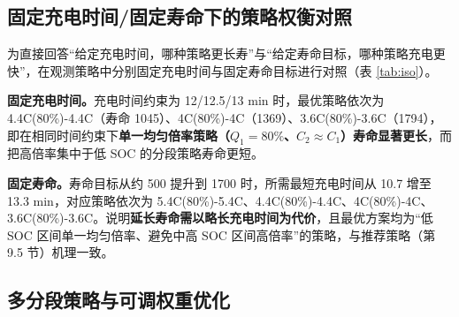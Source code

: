 \documentclass[withoutpreface]{cumcmthesis}
\begin{document}
\subsection{固定充电时间/固定寿命下的策略权衡对照}\label{sec:iso}

为直接回答“给定充电时间，哪种策略更长寿”与“给定寿命目标，哪种策略充电更快”，在观测策略中分别固定充电时间与固定寿命目标进行对照（表 \ref{tab:iso}）。

\textbf{固定充电时间。}充电时间约束为 12/12.5/13 min 时，最优策略依次为 4.4C(80\%)-4.4C（寿命 1045）、4C(80\%)-4C（1369）、3.6C(80\%)-3.6C（1794），即在相同时间约束下\textbf{单一均匀倍率策略（$Q_1=80\%$、$C_2\approx C_1$）寿命显著更长}，而把高倍率集中于低 SOC 的分段策略寿命更短。

\textbf{固定寿命。}寿命目标从约 500 提升到 1700 时，所需最短充电时间从 10.7 增至 13.3 min，对应策略依次为 5.4C(80\%)-5.4C、4.4C(80\%)-4.4C、4C(80\%)-4C、3.6C(80\%)-3.6C。说明\textbf{延长寿命需以略长充电时间为代价}，且最优方案均为“低 SOC 区间单一均匀倍率、避免中高 SOC 区间高倍率”的策略，与推荐策略（第 9.5 节）机理一致。

\begin{table}[htbp]
\centering
\caption{固定充电时间/固定寿命下的最优策略对照}
\label{tab:iso}
\end{table}

\subsection{多分段策略与可调权重优化}
\end{document}
